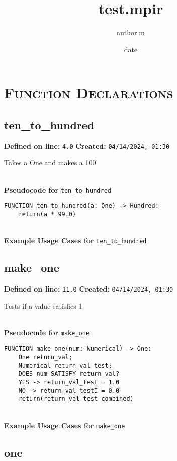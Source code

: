 \documentclass{article}
\title{test.mpir}
\author{author.m}
\date{date}
\begin{document}
\maketitle
\clearpage
\tableofcontents
\clearpage

\section{\textsc{Function Declarations}}

\subsection{ten\_to\_hundred}

\textbf{Defined on line:} \verb|4.0| \hfill \textbf{Created:} \verb|04/14/2024, 01:30| 


Takes a One and makes a 100

\textbf{\\ Pseudocode for } \texttt{ten\_to\_hundred}
\begin{verbatim}
FUNCTION ten_to_hundred(a: One) -> Hundred:
	return(a * 99.0)
\end{verbatim}

\textbf{\\ Example Usage Cases for } \texttt{ten\_to\_hundred}
\clearpage

\subsection{make\_one}

\textbf{Defined on line:} \verb|11.0| \hfill \textbf{Created:} \verb|04/14/2024, 01:30| 


Tests if a value satisfies 1

\textbf{\\ Pseudocode for } \texttt{make\_one}
\begin{verbatim}
FUNCTION make_one(num: Numerical) -> One:
	One return_val;
	Numerical return_val_test;
	DOES num SATISFY return_val?
	YES -> return_val_test = 1.0
	NO -> return_val_testI = 0.0
	return(return_val_test_combined)
\end{verbatim}

\textbf{\\ Example Usage Cases for } \texttt{make\_one}
\clearpage

\subsection{one}
\end{document}
